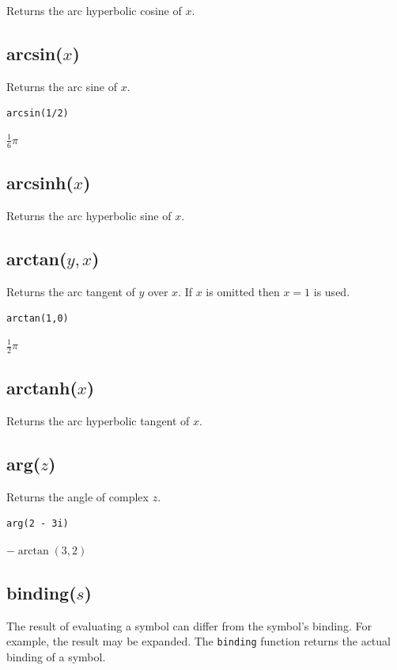 \documentclass[12pt]{article}
\begin{document}
Returns the arc hyperbolic cosine of $x$.

\subsection*{arcsin($x$)}

Returns the arc sine of $x$.

{\color{blue}
\begin{verbatim}
arcsin(1/2)
\end{verbatim}
}

$\tfrac{1}{6}\pi$

\subsection*{arcsinh($x$)}

Returns the arc hyperbolic sine of $x$.

\subsection*{arctan($y,x$)}

Returns the arc tangent of $y$ over $x$.
If $x$ is omitted then $x=1$ is used.

{\color{blue}
\begin{verbatim}
arctan(1,0)
\end{verbatim}
}

$\tfrac{1}{2}\pi$

\subsection*{arctanh($x$)}

Returns the arc hyperbolic tangent of $x$.

\subsection*{arg($z$)}

Returns the angle of complex $z$.

{\color{blue}
\begin{verbatim}
arg(2 - 3i)
\end{verbatim}
}

$-\arctan(3,2)$

\subsection*{binding($s$)}

The result of evaluating a symbol can differ from the symbol's binding.
For example, the result may be expanded.
The {\tt binding} function returns the actual binding of a symbol.
\end{document}
